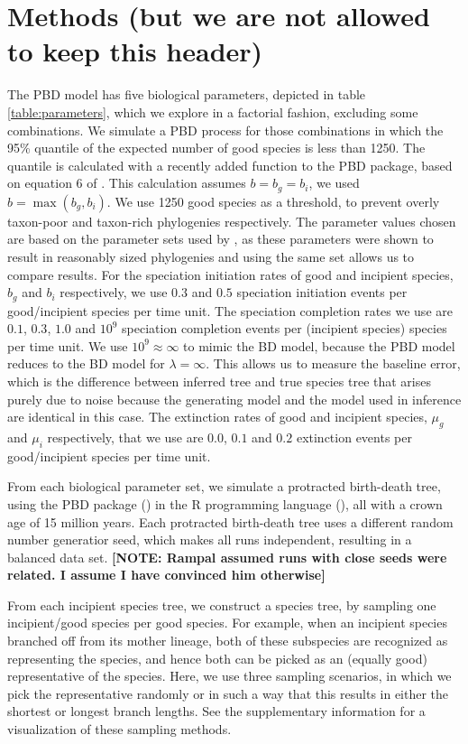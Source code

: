 \documentclass{article}
\begin{document}
\section{Methods (but we are not allowed to keep this header)}

The PBD model has five biological parameters, depicted in table \ref{table:parameters}, 
which we explore in a factorial fashion, excluding some combinations.
We simulate a PBD process for those combinations in which the 
95\% quantile of the expected number of good species is less than 1250.
The quantile is
calculated with a recently added function to the PBD package,
based on equation 6 of \cite{etienne2014}. This calculation
assumes $b = b_g = b_i$, we used $b = \max(b_g, b_i)$.
We use 1250 good species as a threshold, to prevent overly taxon-poor and taxon-rich phylogenies respectively.
The parameter values chosen are based on the parameter sets used by 
\cite{etienne2014}, as these parameters were shown to result in reasonably
sized phylogenies and using the same set allows us to compare results. 
For the speciation initiation rates of good and incipient species, $b_g$ and $b_i$ 
respectively, we use $0.3$ and $0.5$ speciation initiation events per good/incipient species per time unit.
The speciation completion rates we use are $0.1$, $0.3$, $1.0$ and $10^9$ speciation completion
events per (incipient species) species per time unit. We use $10^9 \approx \infty$
to mimic the BD model, because the PBD model reduces to the BD model for $\lambda = \infty$.
This allows us to measure the baseline error, 
which is the difference between inferred tree and true species tree that arises purely due to noise 
because the generating model and the model used in inference are identical in this case.
The extinction rates of good and incipient species, $\mu_g$ and $\mu_i$ respectively, 
that we use are $0.0$, $0.1$ and $0.2$ 
extinction events per good/incipient species per time unit.

From each biological parameter set, we simulate a protracted birth-death tree,
using the PBD package (\cite{pbd}) in the R programming language (\cite{r}), 
all with a crown age of 15 million years.
Each protracted birth-death tree uses a different random number
generatior seed, which makes all runs independent, resulting in a balanced 
data set. \textbf{[NOTE: Rampal assumed runs with close seeds were related. 
I assume I have convinced him otherwise]}

From each incipient species tree, we construct a species tree,
by sampling one incipient/good species per good species. 
For example, when an
incipient species branched off from its mother lineage, 
both of these subspecies are recognized as representing the species, 
and hence both can be picked as an (equally good) representative of the species. 
Here, we use three sampling scenarios,
in which we pick the representative randomly or in such a way that this
results in either the shortest or longest branch lengths. 
See the supplementary information for a visualization of these sampling methods.
\end{document}
